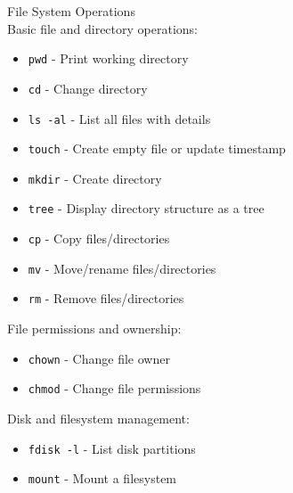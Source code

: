 \begin{definition}{File System Operations}\\
    Basic file and directory operations:
    \begin{itemize}
        \item \texttt{pwd} - Print working directory
        \item \texttt{cd} - Change directory
        \item \texttt{ls -al} - List all files with details
        \item \texttt{touch} - Create empty file or update timestamp
        \item \texttt{mkdir} - Create directory
        \item \texttt{tree} - Display directory structure as a tree
        \item \texttt{cp} - Copy files/directories
        \item \texttt{mv} - Move/rename files/directories
        \item \texttt{rm} - Remove files/directories
    \end{itemize}
    
    File permissions and ownership:
    \begin{itemize}
        \item \texttt{chown} - Change file owner
        \item \texttt{chmod} - Change file permissions
    \end{itemize}
    
    Disk and filesystem management:
    \begin{itemize}
        \item \texttt{fdisk -l} - List disk partitions
        \item \texttt{mount} - Mount a filesystem
    \end{itemize}
\end{definition}

